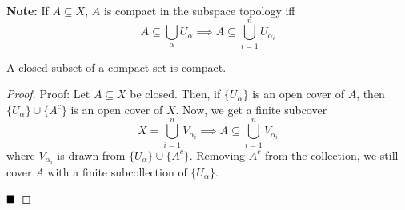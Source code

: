 \textbf{Note:} If $A \subseteq X$, $A$ is compact in the subspace topology iff
\[ A \subseteq \bigcup_{\alpha} U_{\alpha} \implies A \subseteq \bigcup_{i = 1}^{n} U_{\alpha_i} \]

\begin{lemma}
    A closed subset of a compact set is compact.
\end{lemma}
\begin{proof}{Proof:}
    Let $A \subseteq X$ be closed. Then, if $\{U_{\alpha}\}$ is an open cover of $A$, then $\{U_{\alpha}\} \cup \{A^{c}\}$ is an open cover of $X$. Now, we get a finite subcover
    \[ X = \bigcup_{i = 1}^{n} V_{\alpha_i} \implies A \subseteq \bigcup_{i = 1}^{n} V_{\alpha_i} \]
    where $V_{\alpha_i}$ is drawn from $\{U_{\alpha}\} \cup \{A^{c}\}$. Removing $A^{c}$ from the collection, we still cover $A$ with a finite subcollection of $\{U_{\alpha}\}$.

    $\qed$
\end{proof}
